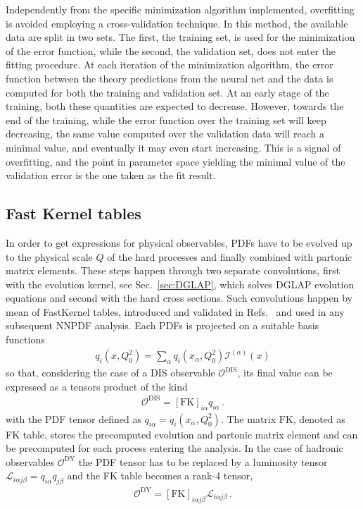 %
Independently from the specific minimization algorithm implemented, overfitting is avoided
employing a cross-validation technique. In this method, the available data are split
in two sets. The first, the training set, is used for the minimization of the error function,
while the second, the validation set, does not enter the fitting procedure. At each iteration of
the minimization algorithm, the error function between the theory predictions from the neural
net and the data is computed for both the training and validation set. At an early stage of
the training, both these quantities are expected to decrease. However, towards the end of the
training, while the error function over the training set will keep decreasing, the same value
computed over the validation data will reach a minimal value, and eventually it may even start
increasing. This is a signal of overfitting, and the point in parameter space yielding the minimal
value of the validation error is the one taken as the fit result.  

\subsection{Fast Kernel tables}
\label{sec:FK_nnpdf}
In order to get expressions for physical observables, PDFs have to be
evolved up to the physical scale $Q$ of the hard processes and finally 
combined with partonic matrix elements. These steps happen through two separate convolutions, first with
the evolution kernel, see Sec.~\ref{sec:DGLAP}, which solves DGLAP evolution equations and second with the hard cross sections.
Such convolutions happen by mean of FastKernel tables, introduced and validated in Refs.~\cite{Ball:2010de,Bertone:2016lga}
and used in any subsequent NNPDF analysis.
Each PDFs is projected on a suitable basis functions
\begin{align}
    \label{eq:pdf_interpolation_basis}
    q_i\left(x,Q_0^2\right) = \sum_{\alpha}q_i\left(x_{\alpha},Q_0^2\right)\mathcal{I}^{(\alpha)}\left(x\right) 
\end{align}
so that, considering the case of a DIS observable $\mathcal{O}^{\text{DIS}}$, its final value 
can be expressed as a tensors product of the kind  
\begin{align}
    \label{eq:DIS_obs}
    \mathcal{O}^{\text{DIS}} = \left[\text{FK}\right]_{i\alpha}q_{i\alpha}\,.
\end{align}
with the PDF tensor defined as $q_{i\alpha} = q_i\left(x_{\alpha},Q_0^2\right)$.
The matrix $\text{FK}$, denoted as FK table, stores the precomputed evolution and partonic matrix element 
and can be precomputed for each process entering the analysis.
In the case of hadronic observables $\mathcal{O}^{\text{DY}}$ 
the PDF tensor has to be replaced by a luminosity tensor $\mathcal{L}_{i\alpha j\beta} = q_{i\alpha}q_{j\beta}$ 
and the FK table becomes a rank-4 tensor,
\begin{align}
    \label{eq:DY_obs}
    \mathcal{O}^{\text{DY}} = \left[\text{FK}\right]_{i\alpha j\beta}\mathcal{L}_{i\alpha j\beta}\,.
\end{align}

